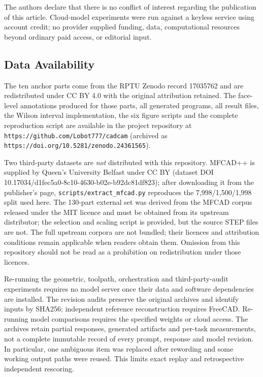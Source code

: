 The authors declare that there is no conflict of interest regarding the publication of this article. Cloud-model experiments were run against a keyless service using account credit; no provider supplied funding, data, computational resources beyond ordinary paid access, or editorial input.

\subsection*{Data Availability}

The ten anchor parts come from the RPTU Zenodo record 17035762 \cite{RPTU2025} and are redistributed under CC BY 4.0 with the original attribution retained. The face-level annotations produced for those parts, all generated programs, all result files, the Wilson interval implementation, the six figure scripts and the complete reproduction script are available in the project repository at \texttt{https://github.com/Lobot777/cadcam} (archived as \texttt{https://doi.org/10.5281/zenodo.24361565}).

Two third-party datasets are \emph{not} distributed with this repository. MFCAD++ \cite{Colligan2022} is supplied by Queen's University Belfast under CC BY (dataset DOI 10.17034/d1fec5a0-8c10-4630-b02e-b92dc81df823); after downloading it from the publisher's page, \texttt{scripts/extract\_mfcad.py} reproduces the 7,998/1,500/1,998 split used here. The 130-part external set was derived from the MFCAD corpus released under the MIT licence and must be obtained from its upstream distributor; the selection and scaling script is provided, but the source STEP files are not. The full upstream corpora are not bundled; their licences and attribution conditions remain applicable when readers obtain them. Omission from this repository should not be read as a prohibition on redistribution under those licences.

Re-running the geometric, toolpath, orchestration and third-party-audit experiments requires no model server once their data and software dependencies are installed. The revision audits preserve the original archives and identify inputs by SHA256; independent reference reconstruction requires FreeCAD. Re-running model comparisons requires the specified weights or cloud access. The archives retain partial responses, generated artifacts and per-task measurements, not a complete immutable record of every prompt, response and model revision. In particular, one ambiguous item was replaced after rewording and some working output paths were reused. This limits exact replay and retrospective independent rescoring.

